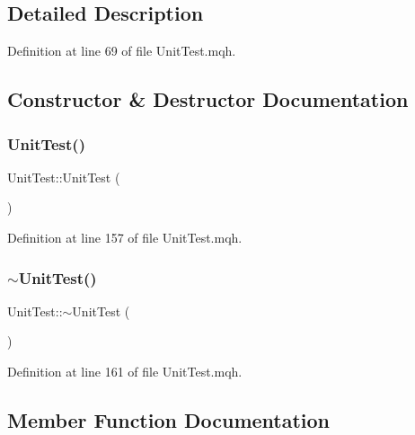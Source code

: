 \subsection{Detailed Description}


Definition at line 69 of file Unit\+Test.\+mqh.



\subsection{Constructor \& Destructor Documentation}
\mbox{\label{class_unit_test_a67ddaff817b55a624741d32550052f4b}} 
\subsubsection{\texorpdfstring{Unit\+Test()}{UnitTest()}}
{\footnotesize\ttfamily Unit\+Test\+::\+Unit\+Test (\begin{DoxyParamCaption}{ }\end{DoxyParamCaption})}



Definition at line 157 of file Unit\+Test.\+mqh.

\mbox{\label{class_unit_test_afa0bdd3e2ac33cd52e697406339a2edf}} 
\subsubsection{\texorpdfstring{$\sim$\+Unit\+Test()}{~UnitTest()}}
{\footnotesize\ttfamily Unit\+Test\+::$\sim$\+Unit\+Test (\begin{DoxyParamCaption}{ }\end{DoxyParamCaption})}



Definition at line 161 of file Unit\+Test.\+mqh.



\subsection{Member Function Documentation}
\mbox{\label{class_unit_test_a094449e95a634326fe16b300a46f92bd}} 
